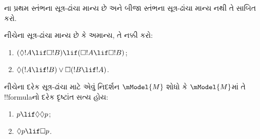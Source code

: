 \documentclass[../../../include/open-logic-section]{subfiles}
\begin{document}
\begin{prob}%
  ના
  પ્રથમ સ્તંભના સૂત્ર-ઢાંચા માન્ય છે અને બીજા સ્તંભના
  સૂત્ર-ઢાંચા માન્ય નથી તે સાબિત કરો.
\end{prob}

\begin{prob}
  નીચેના સૂત્ર-ઢાંચા માન્ય છે કે અમાન્ય, તે નક્કી કરો:
  \begin{enumerate}
  \item $(\Diamond !A \lif \Box !B) \lif (\Box !A \lif \Box
    !B)$;
  \item $\Diamond(!A \lif !B) \lor \Box(!B \lif !A)$.
  \end{enumerate}
\end{prob}

\begin{prob}
  નીચેના દરેક સૂત્ર-ઢાંચા માટે એવું નિદર્શન $\mModel{M}$
  શોધો કે $\mModel{M}$માં તે !!{formula}નો દરેક દૃષ્ટાંત સત્ય હોય:
  \begin{enumerate}
  \item $p \lif \Diamond\Diamond p$;
  \item $\Diamond p \lif \Box p$.
  \end{enumerate}
\end{prob}
\end{document}
